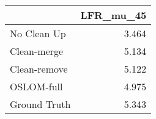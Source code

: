 \begin{tabular}{lr}
\toprule
{} & LFR_mu_45 \\
\midrule
No Clean Up  &     3.464 \\
Clean-merge  &     5.134 \\
Clean-remove &     5.122 \\
OSLOM-full   &     4.975 \\
Ground Truth &     5.343 \\
\bottomrule
\end{tabular}
